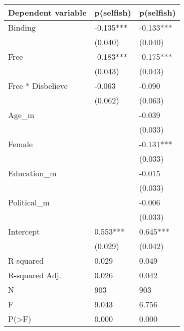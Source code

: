 \begin{tabular}{lll}
\toprule
Dependent variable & p(selfish) & p(selfish) \\
\midrule
Binding           &  -0.135*** &  -0.133*** \\
                  &    (0.040) &    (0.040) \\
Free              &  -0.183*** &  -0.175*** \\
                  &    (0.043) &    (0.043) \\
Free * Disbelieve &     -0.063 &     -0.090 \\
                  &    (0.062) &    (0.063) \\
Age\_m             &            &     -0.039 \\
                  &            &    (0.033) \\
Female            &            &  -0.131*** \\
                  &            &    (0.033) \\
Education\_m       &            &     -0.015 \\
                  &            &    (0.033) \\
Political\_m       &            &     -0.006 \\
                  &            &    (0.033) \\
Intercept         &   0.553*** &   0.645*** \\
                  &    (0.029) &    (0.042) \\
R-squared         &      0.029 &      0.049 \\
R-squared Adj.    &      0.026 &      0.042 \\
N                 &        903 &        903 \\
F                 &      9.043 &      6.756 \\
P(>F)             &      0.000 &      0.000 \\
\bottomrule
\end{tabular}
